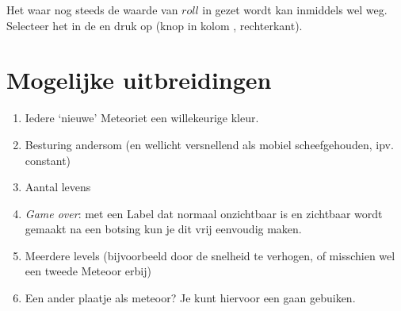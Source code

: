 
\runOpTelefoon{}
Het  waar nog steeds de waarde van $roll$ in gezet wordt kan inmiddels wel weg. Selecteer het in de  en druk op  (knop in kolom , rechterkant). 


\section{Mogelijke uitbreidingen}

\begin{enumerate}
\item	Iedere `nieuwe' Meteoriet een willekeurige kleur. 
\item	Besturing andersom (en wellicht versnellend als mobiel scheefgehouden, ipv. constant)
\item	Aantal levens
\item	\emph{Game over}: met een Label dat normaal onzichtbaar is en zichtbaar wordt gemaakt na een botsing kun je dit vrij eenvoudig maken. 
\item	Meerdere levels (bijvoorbeeld door de snelheid te verhogen, of misschien wel een tweede Meteoor erbij)
\item	Een ander plaatje als meteoor? Je kunt hiervoor een  gaan gebuiken. 
\end{enumerate}


